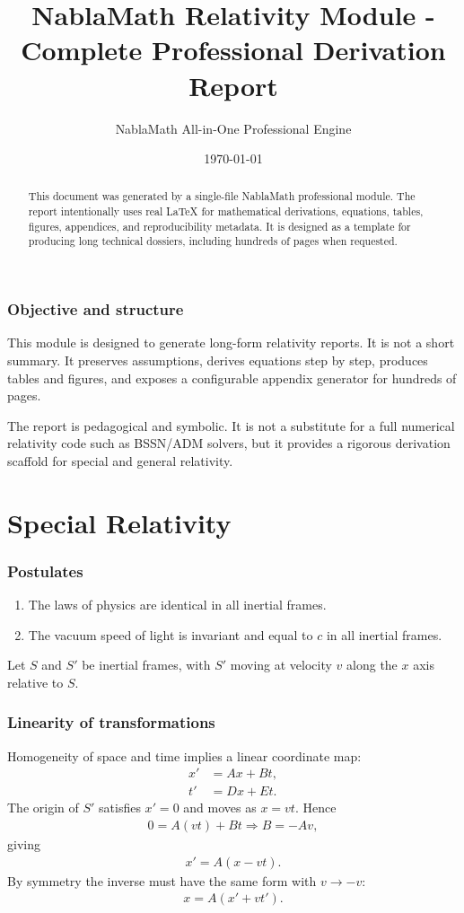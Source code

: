 \documentclass[11pt,a4paper]{article}
\title{NablaMath Relativity Module - Complete Professional Derivation Report}
\author{NablaMath All-in-One Professional Engine}
\date{\today}
\begin{document}
\maketitle
\begin{abstract}
This document was generated by a single-file NablaMath professional module. The report intentionally uses real LaTeX for mathematical derivations, equations, tables, figures, appendices, and reproducibility metadata. It is designed as a template for producing long technical dossiers, including hundreds of pages when requested.
\end{abstract}
\tableofcontents
\newpage
\section{Objective and structure}
This module is designed to generate long-form relativity reports. It is not a short summary. It preserves assumptions, derives equations step by step, produces tables and figures, and exposes a configurable appendix generator for hundreds of pages.
\begin{warningbox}
The report is pedagogical and symbolic. It is not a substitute for a full numerical relativity code such as BSSN/ADM solvers, but it provides a rigorous derivation scaffold for special and general relativity.
\end{warningbox}

\part{Special Relativity}
\section{Postulates}
\begin{enumerate}[label=\textbf{P\arabic*.}]
\item The laws of physics are identical in all inertial frames.
\item The vacuum speed of light is invariant and equal to $c$ in all inertial frames.
\end{enumerate}
Let $S$ and $S'$ be inertial frames, with $S'$ moving at velocity $v$ along the $x$ axis relative to $S$.

\section{Linearity of transformations}
Homogeneity of space and time implies a linear coordinate map:
\begin{align}
x' &= A x + B t, \\
t' &= D x + E t.
\end{align}
The origin of $S'$ satisfies $x'=0$ and moves as $x=vt$. Hence
\begin{align}
0=A(vt)+Bt \Rightarrow B=-Av,
\end{align}
giving
\begin{align}
x'=A(x-vt).
\end{align}
By symmetry the inverse must have the same form with $v\to -v$:
\begin{align}
x=A(x'+vt').
\end{align}
\end{document}

